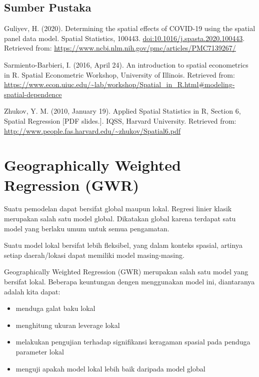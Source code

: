 \documentclass[
]{book}
\begin{document}
\hypertarget{sumber-pustaka-1}{%
\section{Sumber Pustaka}\label{sumber-pustaka-1}}

Guliyev, H. (2020). Determining the spatial effects of COVID-19 using the spatial panel data model. Spatial Statistics, 100443. \url{doi:10.1016/j.spasta.2020.100443}. Retrieved from: \url{https://www.ncbi.nlm.nih.gov/pmc/articles/PMC7139267/}

Sarmiento-Barbieri, I. (2016, April 24). An introduction to spatial econometrics in R. Spatial Econometric Workshop, University of Illinois. Retrieved from: \url{https://www.econ.uiuc.edu/~lab/workshop/Spatial_in_R.html\#modeling-spatial-dependence}

Zhukov, Y. M. (2010, January 19). Applied Spatial Statistics in R, Section 6, Spatial Regression {[}PDF slides.{]}. IQSS, Harvard University. Retrieved from: \url{http://www.people.fas.harvard.edu/~zhukov/Spatial6.pdf}

\hypertarget{geographically-weighted-regression-gwr}{%
\chapter{Geographically Weighted Regression (GWR)}\label{geographically-weighted-regression-gwr}}

Suatu pemodelan dapat bersifat global maupun lokal. Regresi linier klasik merupakan salah satu model global. Dikatakan global karena terdapat satu model yang berlaku umum untuk semua pengamatan.

Suatu model lokal bersifat lebih fleksibel, yang dalam konteks spasial, artinya setiap daerah/lokasi dapat memiliki model masing-masing.

Geographically Weighted Regression (GWR) merupakan salah satu model yang bersifat lokal. Beberapa keuntungan dengen menggunakan model ini, diantaranya adalah kita dapat:

\begin{itemize}
\item
  menduga galat baku lokal
\item
  menghitung ukuran leverage lokal
\item
  melakukan pengujian terhadap signifikansi keragaman spasial pada penduga parameter lokal
\item
  menguji apakah model lokal lebih baik daripada model global
\end{itemize}
\end{document}
